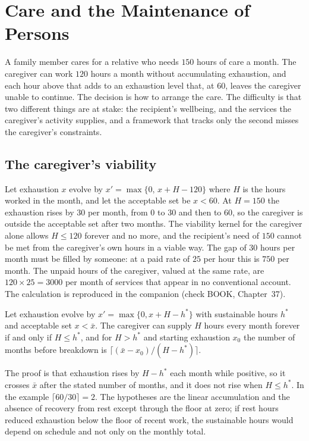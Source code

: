 \chapter{Care and the Maintenance of Persons}\label{ch:37}

A family member cares for a relative who needs $150$ hours of care a month. The caregiver can work $120$ hours a month without accumulating exhaustion, and each hour above that adds to an exhaustion level that, at $60$, leaves the caregiver unable to continue. The decision is how to arrange the care. The difficulty is that two different things are at stake: the recipient's wellbeing, and the services the caregiver's activity supplies, and a framework that tracks only the second misses the caregiver's constraints.

\section{The caregiver's viability}

Let exhaustion $x$ evolve by $x'=\max\{0,\,x+H-120\}$ where $H$ is the hours worked in the month, and let the acceptable set be $x<60$. At $H=150$ the exhaustion rises by $30$ per month, from $0$ to $30$ and then to $60$, so the caregiver is outside the acceptable set after two months. The viability kernel for the caregiver alone allows $H\le 120$ forever and no more, and the recipient's need of $150$ cannot be met from the caregiver's own hours in a viable way. The gap of $30$ hours per month must be filled by someone: at a paid rate of $25$ per hour this is $750$ per month. The unpaid hours of the caregiver, valued at the same rate, are $120\times 25=3000$ per month of services that appear in no conventional account. The calculation is reproduced in the companion (check BOOK, Chapter~37).

\begin{proposition}\label{prop:care}
Let exhaustion evolve by $x'=\max\{0,x+H-h^*\}$ with sustainable hours $h^*$ and acceptable set $x<\bar x$. The caregiver can supply $H$ hours every month forever if and only if $H\le h^*$, and for $H>h^*$ and starting exhaustion $x_0$ the number of months before breakdown is $\lceil(\bar x-x_0)/(H-h^*)\rceil$.
\end{proposition}

The proof is that exhaustion rises by $H-h^*$ each month while positive, so it crosses $\bar x$ after the stated number of months, and it does not rise when $H\le h^*$. In the example $\lceil 60/30\rceil=2$. The hypotheses are the linear accumulation and the absence of recovery from rest except through the floor at zero; if rest hours reduced exhaustion below the floor of recent work, the sustainable hours would depend on schedule and not only on the monthly total.

